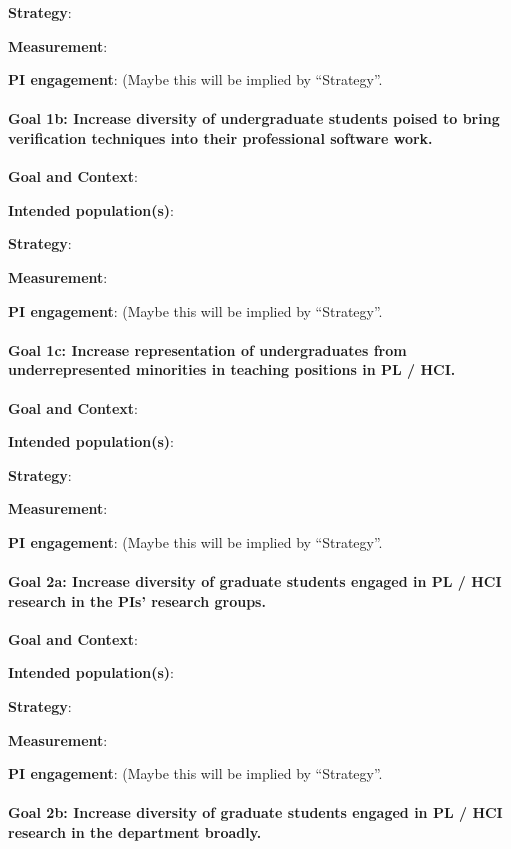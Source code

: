 \textbf{Strategy}:

\textbf{Measurement}:

\textbf{PI engagement}: (Maybe this will be implied by ``Strategy''.

\paragraph*{Goal 1b: Increase diversity of undergraduate students poised to
bring verification techniques into their professional software work.}

\textbf{Goal and Context}:

\textbf{Intended population(s)}:

\textbf{Strategy}:

\textbf{Measurement}:

\textbf{PI engagement}: (Maybe this will be implied by ``Strategy''.

\paragraph*{Goal 1c: Increase representation of undergraduates from
underrepresented minorities in teaching positions in PL / HCI.}

\textbf{Goal and Context}:

\textbf{Intended population(s)}:

\textbf{Strategy}:

\textbf{Measurement}:

\textbf{PI engagement}: (Maybe this will be implied by ``Strategy''.

\paragraph*{Goal 2a: Increase diversity of graduate students engaged in PL / HCI
research in the PIs' research groups.}

\textbf{Goal and Context}:

\textbf{Intended population(s)}:

\textbf{Strategy}:

\textbf{Measurement}:

\textbf{PI engagement}: (Maybe this will be implied by ``Strategy''.

\paragraph*{Goal 2b: Increase diversity of graduate students engaged in PL / HCI
research in the department broadly.}


